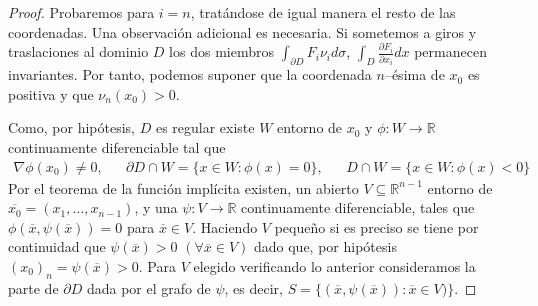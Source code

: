 \documentclass{report}
\newcommand{\realNumbers}{\mathbb{R}}
\theoremstyle{remark}
\begin{document}
\begin{proof}
    Probaremos para \(i = n\), tratándose de igual manera el resto de las coordenadas.
    Una observación adicional es necesaria.
    Si sometemos a giros y traslaciones al dominio \(D\) los dos miembros 
    \(
      \int_{\partial D}
        F_i \nu_i
      d \sigma
    \),
    \(
      \int_D
        \frac{\partial F_i}{\partial x_i}
      dx
    \)
    permanecen invariantes.  %
    Por tanto, podemos suponer que la coordenada \(n\)--ésima de \(x_0\) es positiva y que \(\nu_n(x_0) > 0\).

    Como, por hipótesis, \(D\) es regular existe \(W\) entorno de \(x_0\) y \(\phi : W \rightarrow \realNumbers\) continuamente diferenciable tal que
    \begin{align}
      \nabla \phi (x_0) \neq 0,
      &&\partial D \cap W
      =
      \{x \in W : \phi(x) = 0\},
      &&D \cap W
      =
      \{x \in W : \phi(x) < 0\}
    \end{align}
    Por el teorema de la función implícita existen, un abierto \(V \subseteq \realNumbers^{n - 1}\) entorno de \(\overline{x_0} = (x_1, \dots, x_{n - 1})\),
    y una \(\psi : V \rightarrow \realNumbers\) continuamente diferenciable, tales que \(\phi(\overline{x}, \psi(\overline{x})) = 0\) para \(\overline{x} \in V\).
    Haciendo \(V\) pequeño si es preciso se tiene por continuidad que \(\psi(\overline{x}) > 0\) \((\forall \overline{x} \in V)\) dado que, por hipótesis \((x_0)_n = \psi(\overline{x}) > 0\).
    Para \(V\) elegido verificando lo anterior consideramos la parte de \(\partial D\) dada por el grafo de \(\psi\), es decir,
    \(S = \{
      (\overline{x}, \psi(\overline{x})) : \overline{x} \in V
    )\}\).


\end{proof}
\end{document}
